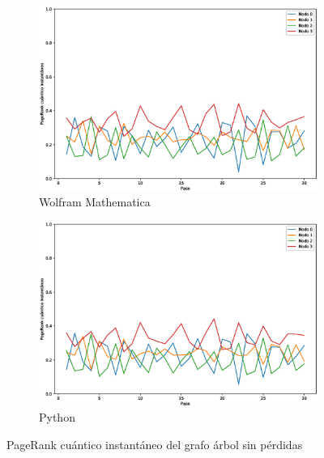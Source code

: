 \begin{figure}[H]
    \centering
    \begin{subfigure}[m]{0.45\textwidth}
        \centering
        \includegraphics[width=0.9\linewidth]{img/tree-inst-M.eps}
        \caption{Wolfram Mathematica}
    \end{subfigure}
    \begin{subfigure}[m]{0.45\textwidth}
        \centering
        \includegraphics[width=0.9\linewidth]{img/tree-inst-lossless.eps}
        \caption{Python}
    \end{subfigure}
    \caption[PageRank cuántico instantáneo del grafo árbol sin pérdidas]{PageRank cuántico instantáneo del grafo árbol sin pérdidas}
    \label{fig:insttreelossless}
\end{figure}

